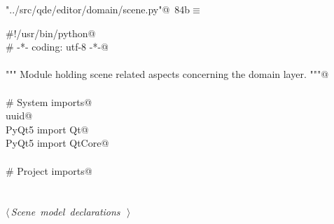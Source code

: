 \documentclass[
    a4paper,      %
    10pt,         %
    openright,    %
    notitlepage,  %
    parskip=half, %
]{scrreprt}       %
\theoremstyle{definition}                    %
\begin{document}
\begin{flushleft} \small
\begin{minipage}{\linewidth}\label{scrap136}\raggedright\small
{} \verb@"../src/qde/editor/domain/scene.py"@\nobreak\ {\footnotesize {84b}}$\equiv$
\vspace{-1ex}
\begin{list}{}{} \item
\mbox{}\lstinline@#!/usr/bin/python@\\
\mbox{}\lstinline@# -*- coding: utf-8 -*-@\\
\mbox{}\lstinline@@\\
\mbox{}\lstinline@""" Module holding scene related aspects concerning the domain layer. """@\\
\mbox{}\lstinline@@\\
\mbox{}\lstinline@# System imports@\\
\mbox{}\lstinline@import uuid@\\
\mbox{}\lstinline@from PyQt5 import Qt@\\
\mbox{}\lstinline@from PyQt5 import QtCore@\\
\mbox{}\lstinline@@\\
\mbox{}\lstinline@# Project imports@\\
\mbox{}\lstinline@@\\
\mbox{}\lstinline@@\\
\mbox{}\lstinline@@\hbox{$\langle\,${\itshape Scene model declarations}\nobreak\ {\footnotesize {}}$\,\rangle$}\lstinline@@\\
\mbox{}\lstinline@@{\NWsep}
\end{list}
\vspace{-1.5ex}
\footnotesize
\begin{list}{}{\setlength{\itemsep}{-\parsep}\setlength{\itemindent}{-\leftmargin}}

\item{}
\end{list}
\end{minipage}\vspace{4ex}
\end{flushleft}
\end{document}
